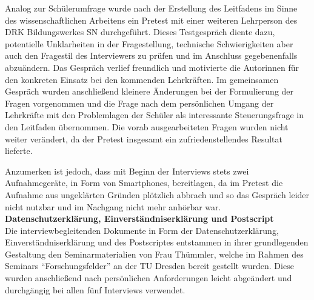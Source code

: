 \noindent
Analog zur Schülerumfrage wurde nach der Erstellung des Leitfadens im Sinne des wissenschaftlichen Arbeitens ein Pretest mit einer weiteren Lehrperson des DRK Bildungswerkes SN durchgeführt. Dieses Testgespräch diente dazu, potentielle Unklarheiten in der Fragestellung, technische Schwierigkeiten aber auch den Fragestil des Interviewers zu prüfen und im Anschluss gegebenenfalls abzuändern. Das Gespräch verlief freundlich und motivierte die Autorinnen für den konkreten Einsatz bei den kommenden Lehrkräften. Im gemeinsamen Gespräch wurden anschließend kleinere Änderungen bei der Formulierung der Fragen vorgenommen und die Frage nach dem persönlichen Umgang der Lehrkräfte mit den Problemlagen der Schüler als interessante Steuerungsfrage in den Leitfaden übernommen. Die vorab ausgearbeiteten Fragen wurden nicht weiter verändert, da der Pretest insgesamt ein zufriedenstellendes Resultat lieferte. 

Anzumerken ist jedoch, dass mit Beginn der Interviews stets zwei Aufnahmegeräte, in Form von Smartphones, bereitlagen, da im Pretest die Aufnahme aus ungeklärten Gründen plötzlich abbrach und so das Gespräch leider nicht nutzbar und im Nachgang nicht mehr anhörbar war.\\

\noindent
\textbf{Datenschutzerklärung, Einverständniserklärung und Postscript}\\

\noindent
Die interviewbegleitenden Dokumente in Form der Datenschutzerklärung, Einverständniserklärung und des Postscriptes entstammen in ihrer grundlegenden Gestaltung den Seminarmaterialien von Frau Thümmler, welche im Rahmen des Seminars "`Forschungsfelder"' an der TU Dresden bereit gestellt wurden. Diese wurden anschließend nach persönlichen Anforderungen leicht abgeändert und durchgängig bei allen fünf Interviews verwendet.
